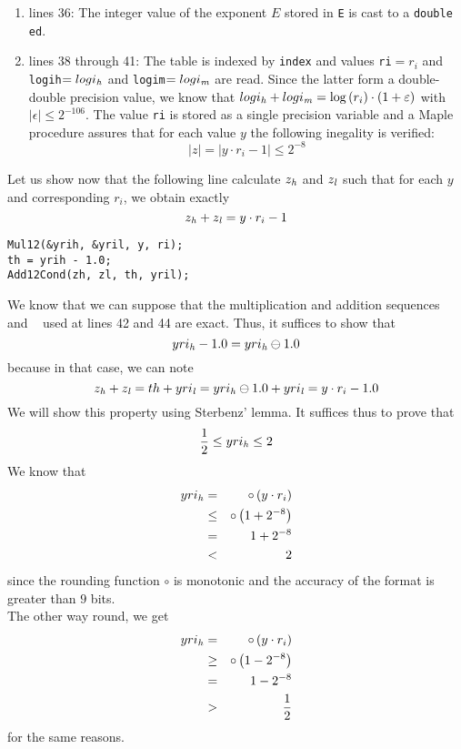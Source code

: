 {\begin{enumerate}
\item lines 36: The integer value of the exponent $E$ stored in {\tt E} is cast to a {\tt double ed}.
\item lines 38 through 41: The table is indexed by {\tt index} and values {\tt ri}$=r_i$ and 
{\tt logih}$=logi_{\mathit{h}}$ and {\tt logim}$=logi_{\mathit{m}}$ are read. 
Since the latter form a double-double precision value, we know that 
$logi_{\mathit{h}} + logi_{\mathit{m}} = \log\left( r_i \right) \cdot \left( 1 + \varepsilon \right)$ with $\left \vert \epsilon \right \vert \leq 2^{-106}$.
The value {\tt ri} is stored as a single precision variable and a Maple procedure assures that for each value
$y$ the following inegality is verified:
$$\left \vert z \right \vert = \left \vert y \cdot r_i - 1 \right \vert \leq 2^{-8}$$
\end{enumerate}
} 
Let us show now that the following line calculate $z_{\mathit{h}}$ and $z_{\mathit{l}}$ such that for each $y$ and corresponding $r_i$,
we obtain exactly
$$z_{\mathit{h}} + z_{\mathit{l}} = y \cdot r_i - 1$$
\begin{lstlisting}[caption={Argument reduction},firstnumber=42]
Mul12(&yrih, &yril, y, ri);
th = yrih - 1.0; 
Add12Cond(zh, zl, th, yril); 
\end{lstlisting}
We know that we can suppose that the multiplication and addition sequences \Mul~ and \Add~ used at lines
42 and 44 are exact. Thus, it suffices to show that
$$yri_{\mathit{h}} - 1.0 = yri_{\mathit{h}} \ominus 1.0$$
because in that case, we can note
$$z_{\mathit{h}} + z_{\mathit{l}} = th + yri_{\mathit{l}} = yri_{\mathit{h}} \ominus 1.0 + yri_{\mathit{l}} = y \cdot r_i - 1.0$$
We will show this property using Sterbenz' lemma. It suffices thus to prove that
$$\frac{1}{2} \leq yri_{\mathit{h}} \leq 2$$
We know that 
\begin{eqnarray*}
yri_{\mathit{h}} & = & \circ\left( y \cdot r_i \right) \\
& \leq & \circ \left( 1 + 2^{-8} \right) \\
& = & 1 + 2^{-8} \\
& < & 2
\end{eqnarray*}
since the rounding function $\circ$ is monotonic and the accuracy of the format is greater than $9$ bits.\\
The other way round, we get
\begin{eqnarray*}
yri_{\mathit{h}} & = & \circ \left( y \cdot r_i \right) \\
& \geq & \circ \left( 1 - 2^{-8} \right) \\
& = & 1 - 2^{-8} \\
& > & \frac{1}{2}
\end{eqnarray*}
for the same reasons.\\
